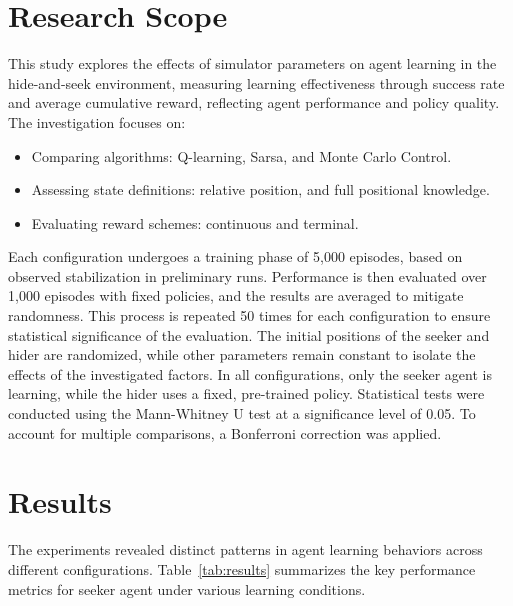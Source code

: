 \documentclass[runningheads]{llncs}
\begin{document}
\section{Research Scope}
This study explores the effects of simulator parameters on agent learning in the hide-and-seek environment, measuring learning effectiveness through success rate and average cumulative reward, reflecting agent performance and policy quality. The investigation focuses on:
\begin{itemize}
    \item Comparing algorithms: Q-learning, Sarsa, and Monte Carlo Control.
    \item Assessing state definitions: relative position, and full positional knowledge.
    \item Evaluating reward schemes: continuous and terminal.
\end{itemize}
Each configuration undergoes a training phase of 5,000 episodes, based on observed stabilization in preliminary runs. Performance is then evaluated over 1,000 episodes with fixed policies, and the results are averaged to mitigate randomness. This process is repeated 50 times for each configuration to ensure statistical significance of the evaluation. The initial positions of the seeker and hider are randomized, while other parameters remain constant to isolate the effects of the investigated factors. In all configurations, only the seeker agent is learning, while the hider uses a fixed, pre-trained policy. Statistical tests were conducted using the Mann-Whitney U test at a significance level of 0.05. To account for multiple comparisons, a Bonferroni correction was applied.

\section{Results}
The experiments revealed distinct patterns in agent learning behaviors across different configurations. Table~\ref{tab:results} summarizes the key performance metrics for seeker agent under various learning conditions.
\\
\end{document}
